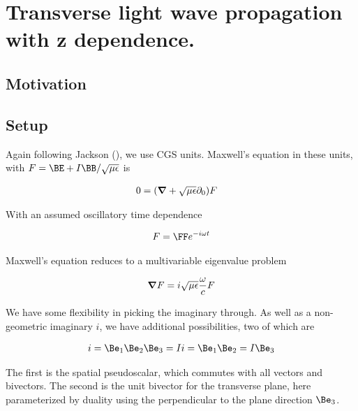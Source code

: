

\chapter{Transverse light wave propagation with z dependence.}
\label{chap:maxwellHomoFirstOrder}
{}
\date{Aug 9, 2009}

\beginArtWithToc

\section{Motivation}

\section{Setup}

Again following Jackson (\cite{jackson1975cew}), we use CGS units.  Maxwell's equation in these units, with $F = \BE + I\BB/\sqrt{\mu\epsilon}$ is

\begin{align}\label{eqn:foo1}
0 &= (\boldsymbol{\nabla} + \sqrt{\mu\epsilon} \partial_0) F 
\end{align}

With an assumed oscillatory time dependence 

\begin{align}\label{eqn:foo2}
F = \FF e^{-i\omega t}
\end{align}

Maxwell's equation reduces to a multivariable eigenvalue problem

\begin{align}\label{eqn:foo3}
\boldsymbol{\nabla} F = i\sqrt{\mu\epsilon} \frac{\omega}{c} F 
\end{align}

We have some flexibility in picking the imaginary through.  As well as a non-geometric imaginary $i$, we have additional possibilities, two of which are

\begin{align*}
i = \Be_1\Be_2\Be_3 = I
i = \Be_1 \Be_2 = I \Be_3
\end{align*}

The first is the spatial pseudoscalar, which commutes with all vectors and bivectors.  The second is the unit bivector for the transverse plane, here parameterized by duality using the perpendicular to the plane direction $\Be_3$.

\EndArticle
